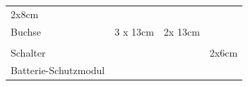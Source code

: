 \documentclass[
]{article}
\begin{document}
\begin{longtable}[]{@{}llll@{}}
\begin{minipage}[t]{0.22\columnwidth}
{2x8cm}\strut
\end{minipage}\tabularnewline
\begin{minipage}[t]{0.22\columnwidth}\raggedright
{Buchse}\strut
\end{minipage} & \begin{minipage}[t]{0.22\columnwidth}\raggedright
{3 x 13cm}\strut
\end{minipage} & \begin{minipage}[t]{0.22\columnwidth}\raggedright
{2x 13cm}\strut
\end{minipage} & \begin{minipage}[t]{0.22\columnwidth}\raggedright
{}\strut
\end{minipage}\tabularnewline
\begin{minipage}[t]{0.22\columnwidth}\raggedright
{}\strut
\end{minipage} & \begin{minipage}[t]{0.22\columnwidth}\raggedright
{}\strut
\end{minipage} & \begin{minipage}[t]{0.22\columnwidth}\raggedright
{}\strut
\end{minipage} & \begin{minipage}[t]{0.22\columnwidth}\raggedright
{}\strut
\end{minipage}\tabularnewline
\begin{minipage}[t]{0.22\columnwidth}\raggedright
{Schalter}\strut
\end{minipage} & \begin{minipage}[t]{0.22\columnwidth}\raggedright
{}\strut
\end{minipage} & \begin{minipage}[t]{0.22\columnwidth}\raggedright
{}\strut
\end{minipage} & \begin{minipage}[t]{0.22\columnwidth}\raggedright
{2x6cm}\strut
\end{minipage}\tabularnewline
\begin{minipage}[t]{0.22\columnwidth}\raggedright
{Batterie-Schutzmodul}\strut
\end{minipage} & \begin{minipage}[t]{0.22\columnwidth}\raggedright
{}\strut
\end{minipage} & \begin{minipage}[t]{0.22\columnwidth}\raggedright
{}\strut
\end{minipage} & \begin{minipage}[t]{0.22\columnwidth}\raggedright

\end{minipage}
\end{longtable}
\end{document}
